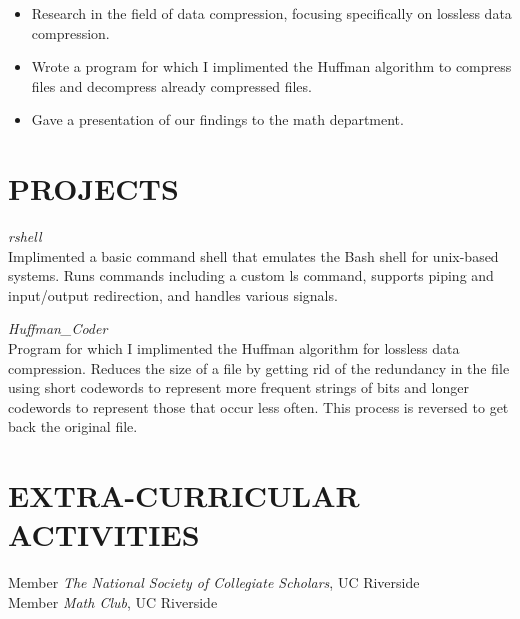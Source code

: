 \documentclass[margin, 10pt]{res}
\begin{document}
\begin{resume}
\begin{itemize} \itemsep -2pt 
\item Research in the field of data compression, focusing specifically on lossless data compression.
\item Wrote a program for which I implimented the Huffman algorithm to compress files and decompress already compressed files.
\item Gave a presentation of our findings to the math department.
\end{itemize}

\section{PROJECTS}

{\sl rshell} \\
Implimented a basic command shell that emulates the Bash shell for unix-based systems. Runs commands including a custom ls command, supports piping and input/output redirection, and handles various signals. 

{\sl Huffman\_Coder} \\
Program for which I implimented the Huffman algorithm for lossless data compression. Reduces the size of a file by getting rid of the redundancy in the file using short codewords to represent more frequent strings of bits and longer codewords to represent those that occur less often. This process is reversed to get back the original file.

\section{EXTRA-CURRICULAR \\ ACTIVITIES} 

Member {\it The National Society of Collegiate Scholars}, UC Riverside \\
Member {\it Math Club}, UC Riverside

\end{resume}
\end{document}
